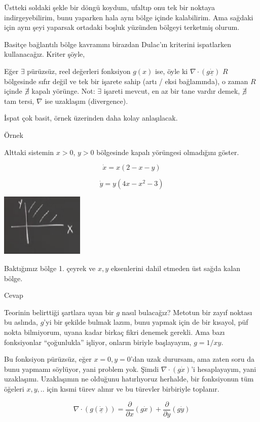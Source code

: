 \documentclass[12pt,fleqn]{article}\usepackage{../../common}
\begin{document}
Üstteki soldaki şekle bir döngü koydum, ufaltıp onu tek bir noktaya
indirgeyebilirim, bunu yaparken hala aynı bölge içinde kalabilirim. Ama sağdaki
için aynı şeyi yaparsak ortadaki boşluk yüzünden bölgeyi terketmiş
olurum.

Basitçe bağlantılı bölge kavramını birazdan Dulac'ın kriterini ispatlarken
kullanacağız. Kriter şöyle,

Eğer $\exists$ pürüzsüz, reel değerleri fonksiyon $g(x)$ ise, öyle ki $\nabla
\cdot (g \dot{\underline{x}})$ $R$ bölgesinde sıfır değil ve tek bir işarete
sahip (artı / eksi bağlamında), o zaman $R$ içinde $\cancel{\exists}$ kapalı
yörünge. Not: $\exists$ işareti mevcut, en az bir tane vardır demek,
$\cancel{\exists}$ tam tersi, $\nabla$ ise uzaklaşım (divergence).

İspat çok basit, örnek üzerinden daha kolay anlaşılacak.

Örnek

Alttaki sistemin $x>0$, $y>0$ bölgesinde kapalı yörüngesi olmadığını göster.

$$ \dot{x} = x(2 - x - y) $$

$$ \dot{y} = y(4x - x^2 - 3) $$

\includegraphics[height=3cm]{09_03.png}

Baktığımız bölge 1. çeyrek ve $x,y$ eksenlerini dahil etmeden üst sağda kalan
bölge. 

Cevap

Teorinin belirttiği şartlara uyan bir $g$ nasıl bulacağız? Metotun bir zayıf
noktası bu aslında, $g$'yi bir şekilde bulmak lazım, bunu yapmak için de bir
kısayol, püf nokta bilmiyorum, uyana kadar birkaç fikri denemek gerekli. Ama
bazı fonksiyonlar ``çoğunlukla'' işliyor, onların biriyle başlayayım, $g =
1/xy$.

Bu fonksiyon pürüzsüz, eğer $x=0,y=0$'dan uzak durursam, ama zaten soru da bunu
yapmamı söylüyor, yani problem yok. Şimdi $\nabla \cdot (g \dot{x}) $'i
hesaplayayım, yani uzaklaşımı. Uzaklaşımın ne olduğunu hatırlıyoruz herhalde,
bir fonksiyonun tüm öğeleri $x,y,..$ için kısmi türev alınır ve bu türevler
birbiriyle toplanır.

$$
\nabla \cdot (g(\dot{\underline{x}})) =
\frac{\partial }{\partial x} (g \dot{x} ) +
\frac{\partial }{\partial y} (g \dot{y} )
$$
\end{document}
